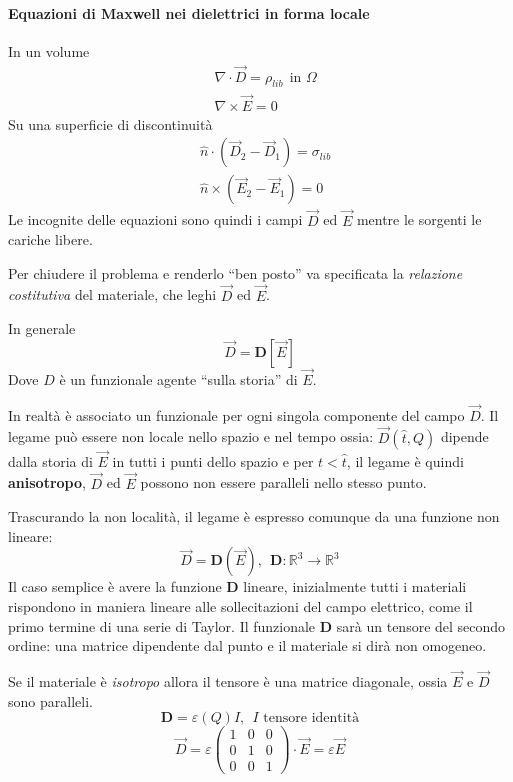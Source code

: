 \paragraph{Equazioni di Maxwell nei dielettrici in forma locale}
In un volume
\begin{align*}
&\nabla \cdot\vec{D} = \rho_{lib}\ \ \text{in }\Omega\\
&\nabla \times \vec{E} = 0
\end{align*}
Su una superficie di discontinuità
\begin{align*}
&\hat{n}\cdot\left(\vec{D}_2-\vec{D}_1\right) = \sigma_{lib}\\
&\hat{n}\times\left(\vec{E}_2-\vec{E}_1\right) = 0
\end{align*}
Le incognite delle equazioni sono quindi i campi $\vec{D}$ ed 
$\vec{E}$ mentre le sorgenti le cariche libere.

Per chiudere il problema e renderlo ``ben posto'' va specificata
la \textit{relazione costitutiva} del materiale, che leghi
$\vec{D}$ ed $\vec{E}$.

In generale
$$
\vec{D} = \mathbf{D}[\vec{E}]
$$
Dove $D$ è un funzionale agente ``sulla storia'' di $\vec{E}$.

In realtà è associato un funzionale per ogni singola componente
del campo $\vec{D}$.
Il legame può essere non locale nello spazio e nel tempo ossia:
$\vec{D}(\hat{t},Q)$ dipende dalla storia di $\vec{E}$ in tutti 
i punti dello spazio e per $t < \hat{t}$, il legame è quindi
\textbf{anisotropo}, $\vec{D}$ ed $\vec{E}$ possono non essere
paralleli nello stesso punto.

Trascurando la non località, il legame è espresso comunque da una 
funzione non lineare:
$$
\vec{D} = \mathbf{D}(\vec{E}),\ \ \mathbf{D}: \mathbb{R}^3 \to \mathbb{R}^3
$$
Il caso semplice è avere la funzione $\mathbf{D}$ lineare, 
inizialmente tutti i materiali rispondono in 
maniera lineare alle sollecitazioni del campo elettrico, come
il primo termine di una serie di Taylor. Il funzionale $\mathbf{D}$ 
sarà un tensore del secondo ordine: una matrice dipendente dal 
punto e il materiale si dirà non omogeneo.

Se il materiale è \textit{isotropo} allora il tensore è una matrice
diagonale, ossia $\vec{E}$ e $\vec{D}$ sono paralleli.
$$
\mathbf{D} = \varepsilon(Q)I,\ \ I\text{ tensore identità}
$$
$$
\vec{D} = \varepsilon \begin{pmatrix}
                       1 & 0 & 0 \\
                       0 & 1 & 0 \\
                       0 & 0 & 1
                      \end{pmatrix} \cdot \vec{E} = \varepsilon\vec{E}
$$

